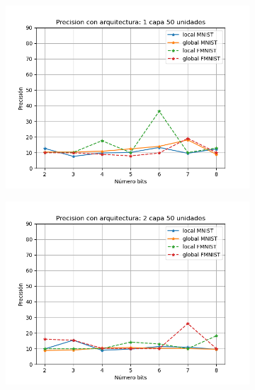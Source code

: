 \begin{figure}[H]
    \begin{subfigure}[H]{0.45\textwidth}
    \includegraphics[width=\textwidth]{imagenes/dni/Precision con arquitectura: 1 capa 50 unidades.png}
    \end{subfigure}
    \begin{subfigure}[H]{0.45\textwidth}
    \includegraphics[width=\textwidth]{imagenes/dni/Precision con arquitectura: 2 capa 50 unidades.png}
    \end{subfigure}
    \begin{subfigure}[H]{0.45\textwidth}

\end{subfigure}
\end{figure}

